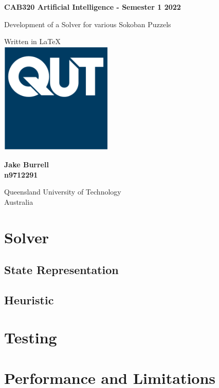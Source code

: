 \documentclass[a4paper,12pt]{article}
\begin{document}
\begin{titlepage}
   \begin{center}
       \vspace*{1cm}
 
       \textbf{CAB320 Artificial Intelligence - Semester 1 2022}
 
       \vspace{0.5cm}
        \LARGE{Development of a Solver for various Sokoban Puzzels}
 
       \vspace{1.5cm}

       \vfill
       
       \vspace{0.8cm}
       \normalsize
 	   Written in \LaTeX \\
       \includegraphics[width=0.4\textwidth]{QUT}

       \large
       \textbf{Jake Burrell}\\
       \textbf{n9712291}

       \vspace{1.5cm}
 
       \normalsize
       Queensland University of Technology\\
       Australia\\ 
   \end{center}
\end{titlepage}

\tableofcontents

\section{Solver}


\subsection{State Representation}
\subsection{Heuristic}

\section{Testing}

\section{Performance and Limitations}
\end{document}
